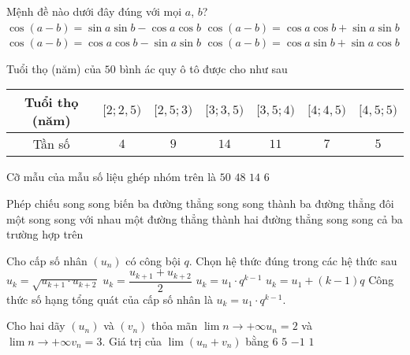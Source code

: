 \begin{ex}%
	Mệnh đề nào dưới đây đúng với mọi $a$, $b$?
	\choice
	{$\cos{\left(a - b \right)} = \sin{a} \sin{b} - \cos{a}\cos{b}$}
	{\True $\cos{\left(a - b \right)} = \cos{a}\cos{b} + \sin{a} \sin{b}$}
	{$\cos{\left(a - b \right)} = \cos{a}\cos{b} - \sin{a} \sin{b}$}
	{$\cos{\left(a - b \right)} = \cos{a}\sin{b} + \sin{a} \cos{b}$}
\end{ex}

\begin{ex}%
	Tuổi thọ (năm) của $50$ bình ác quy ô tô được cho như sau
	\begin{center}
		\begin{tabular}{|c|c|c|c|c|c|c|}
			\hline
			Tuổi thọ (năm) & $[2;2{,}5)$ & $[2{,}5;3)$ & $[3;3{,}5)$ & $[3{,}5;4)$ & $[4;4{,}5)$ & $[4{,}5;5)$ \\
			\hline
			Tần số         & $4$         & $9$         & $14$        & $11$        & $7$         & $5$         \\
			\hline
		\end{tabular}
	\end{center}
	Cỡ mẫu của mẫu số liệu ghép nhóm trên là
	\choice
	{\True $50$}
	{$48$}
	{$14$}
	{$6$}
\end{ex}

\begin{ex}%
	Phép chiếu song song biến ba đường thẳng song song thành
	\choice
	{ba đường thẳng đôi một song song với nhau}
	{một đường thẳng}
	{thành hai đường thẳng song song}
	{\True cả ba trường hợp trên}
\end{ex}

\begin{ex}%
	Cho cấp số nhân $(u_n)$ có công bội $q$. Chọn hệ thức đúng trong các hệ thức sau
	\choice
	{$u_k=\sqrt{u_{k+1}\cdot u_{k+2}}$}
	{$u_k=\dfrac{u_{k+1}+u_{k+2}}{2}$}
	{\True $u_k=u_1\cdot q^{k-1}$}
	{$u_k=u_1+(k-1)q$}
	\loigiai
	{
		Công thức số hạng tổng quát của cấp số nhân là $u_k=u_1\cdot q^{k-1}$.
	}
\end{ex}

\begin{ex}%
	Cho hai dãy $\left(u_n\right)$ và $\left(v_n\right)$ thỏa mãn $\lim \limits{n \to +\infty}u_n=2$ và $\lim \limits{n \to +\infty}v_n=3.$ Giá trị của $\lim\left(u_n+v_n\right)$ bằng
	\choice
	{$ 6$}
	{\True $ 5$}
	{$-1$}
	{$ 1$}

\end{ex}

